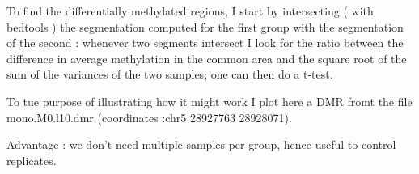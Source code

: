 \documentclass[12pt]{amsart}
\newcommand{\gimli}{\texttt{gimli}}
\begin{document}
To find the differentially methylated regions, I start by intersecting
( with bedtools\cite{bedtools} ) the segmentation computed for the first group
with the segmentation of the second : whenever two segments intersect I look
for the ratio between the difference in average methylation in the common area 
and the square root of the sum of the variances of the two samples; one can then
do a t-test.

To tue purpose of illustrating how it might work I plot here a DMR 
fromt the file mono.M0.l10.dmr  (coordinates :chr5	28927763	28928071).

Advantage : we don't need multiple samples per group, hence useful to control
replicates.









\end{document}
